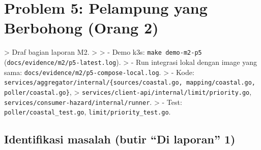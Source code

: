 \chapter{Problem 5: Pelampung yang Berbohong (Orang 2)}

> Draf bagian laporan M2. > > - Demo k3s: \texttt{make demo-\allowbreak{}m2-\allowbreak{}p5} (\texttt{docs/\allowbreak{}evidence/\allowbreak{}m2/\allowbreak{}p5-\allowbreak{}latest.\allowbreak{}log}). > - Run integrasi lokal dengan image yang sama: \texttt{docs/\allowbreak{}evidence/\allowbreak{}m2/\allowbreak{}p5-\allowbreak{}compose-\allowbreak{}local.\allowbreak{}log}. > - Kode: \texttt{services/\allowbreak{}aggregator/\allowbreak{}internal/\allowbreak{}\{sources/\allowbreak{}coastal.\allowbreak{}go,\allowbreak{} mapping/\allowbreak{}coastal.\allowbreak{}go,\allowbreak{} poller/\allowbreak{}coastal.\allowbreak{}go\}}, >   \texttt{services/\allowbreak{}client-\allowbreak{}api/\allowbreak{}internal/\allowbreak{}limit/\allowbreak{}priority.\allowbreak{}go}, \texttt{services/\allowbreak{}consumer-\allowbreak{}hazard/\allowbreak{}internal/\allowbreak{}runner}. > - Test: \texttt{poller/\allowbreak{}coastal\_\allowbreak{}test.\allowbreak{}go}, \texttt{limit/\allowbreak{}priority\_\allowbreak{}test.\allowbreak{}go}.


\section{Identifikasi masalah (butir ``Di laporan'' 1)}

